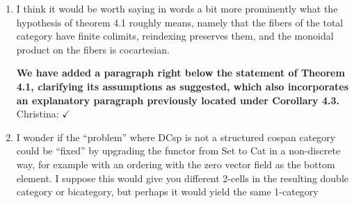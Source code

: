 \documentclass[reqno]{amsart}
\def\chris{\color{purple} Christina: }
\begin{document}
\begin{enumerate}
{\bf Done.} {\chris $\checkmark$}

\item I think it would be worth saying in words a bit more prominently what the hypothesis of theorem 4.1 roughly means, namely that the fibers of 
the total 
category have finite colimits, reindexing preserves them, and the monoidal product on the fibers is cocartesian.

{\bf We have added a paragraph right below the statement of Theorem 4.1, clarifying its assumptions as suggested, which also incorporates an 
explanatory paragraph previously located under Corollary 4.3.} {\chris $\checkmark$}

\item I wonder if the “problem” where DCsp is not a structured cospan category could be “fixed” by upgrading the functor from Set to Cat in a 
non-discrete 
way, for example with an ordering with the zero vector field as the bottom element. I suppose this would give you different 2-cells in the resulting 
double category or bicategory, but perhaps it would yield the same 1-category
\end{enumerate}
\end{document}
